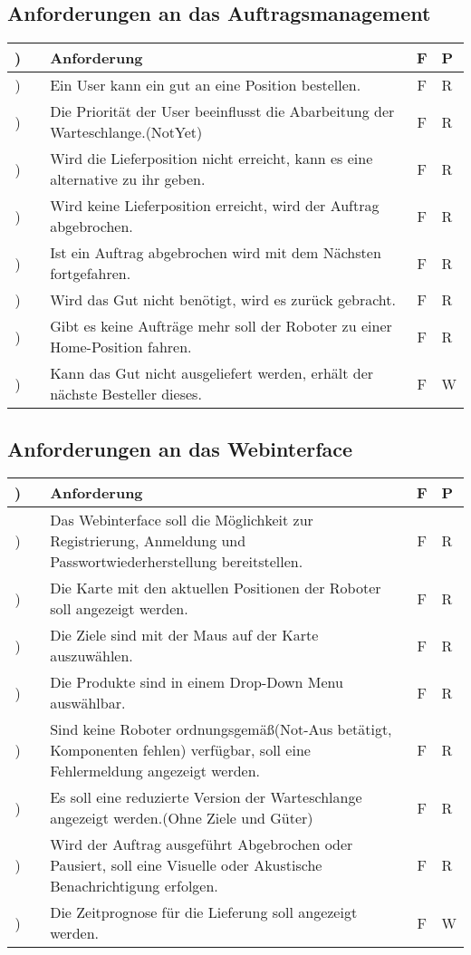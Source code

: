 \subsection{Anforderungen an das Auftragsmanagement}
\setcounter{rowno}{0}
\begin{tabular}{>{\stepcounter{rowno}\therowno)}cl p{13cm}|cl}
\multicolumn{1}{l}{AM} && Anforderung & F & P \\
\hline
&& Ein User kann ein gut an eine Position bestellen.&F&R \\
&& Die Priorität der User beeinflusst die Abarbeitung der Warteschlange.(NotYet)&F&R \\
&& Wird die Lieferposition nicht erreicht, kann es eine alternative zu ihr geben.&F&R \\
&& Wird keine Lieferposition erreicht, wird der Auftrag abgebrochen.&F&R\\
&& Ist ein Auftrag abgebrochen wird mit dem Nächsten fortgefahren.&F&R\\
&& Wird das Gut nicht benötigt, wird es zurück gebracht.&F&R\\
&& Gibt es keine Aufträge mehr soll der Roboter zu einer Home-Position fahren.&F&R\\
&& Kann das Gut nicht ausgeliefert werden, erhält der nächste Besteller dieses.&F&W\\
\end{tabular}

\subsection{Anforderungen an das Webinterface}
\setcounter{rowno}{0}
\begin{tabular}{>{\stepcounter{rowno}\therowno)}cl p{13cm}|cl}
\multicolumn{1}{l}{AM} && Anforderung & F & P \\
\hline
&& Das Webinterface soll die Möglichkeit zur Registrierung, Anmeldung und Passwortwiederherstellung bereitstellen.&F&R \\
&& Die Karte mit den aktuellen Positionen der Roboter soll angezeigt werden.&F&R \\
&& Die Ziele sind mit der Maus auf der Karte auszuwählen.&F&R \\
&& Die Produkte sind in einem Drop-Down Menu auswählbar.&F&R \\
&& Sind keine Roboter ordnungsgemäß(Not-Aus betätigt, Komponenten fehlen)  verfügbar, soll eine Fehlermeldung angezeigt werden.&F&R \\
&& Es soll eine reduzierte Version der Warteschlange angezeigt werden.(Ohne Ziele und Güter)&F&R \\
&& Wird der Auftrag ausgeführt Abgebrochen oder Pausiert, soll eine Visuelle oder Akustische Benachrichtigung erfolgen.&F&R \\
&& Die Zeitprognose für die Lieferung soll angezeigt werden.&F&W \\
\end{tabular}

